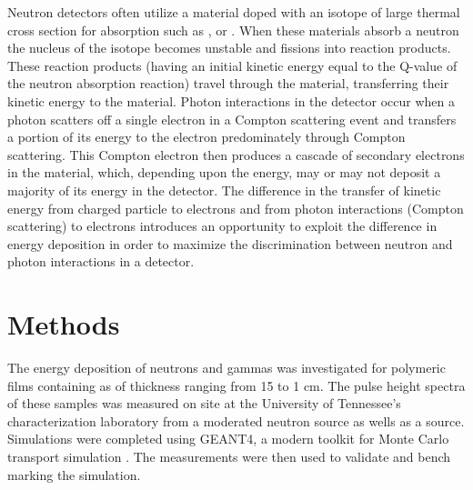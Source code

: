 \documentclass[draftcls,onecolumn]{IEEEtran}
\begin{document}
Neutron detectors often utilize a material doped with an isotope of large thermal cross section for absorption such as ,  or . 
When these materials absorb a neutron the nucleus of the isotope becomes unstable and fissions into reaction products.
These reaction products (having an initial kinetic energy equal to the Q-value of the neutron absorption reaction) travel through the material, transferring their kinetic energy to the material.
Photon interactions in the detector occur when a photon scatters off a single electron in a Compton scattering event and transfers a portion of its energy to the electron predominately through Compton scattering.
This Compton electron then produces a cascade of secondary electrons in the material, which, depending upon the energy, may or may not deposit a majority of its energy in the detector.
The difference in the transfer of kinetic energy from charged particle to electrons and from photon interactions (Compton scattering) to electrons introduces an opportunity to exploit the difference in energy deposition in order to maximize the discrimination between neutron and photon interactions in a detector.

\section{Methods}
\label{sec:Methods}
The energy deposition of neutrons and gammas was investigated for polymeric films containing  as  of thickness ranging from 15 \micron to 1 cm.
The pulse height spectra of these samples was measured on site at the University of Tennessee's characterization laboratory from a moderated neutron source as wells as a  source.
Simulations were completed using GEANT4, a modern toolkit for Monte Carlo transport simulation \cite{agostinelli_geant4simulation_2003,allison_geant4_2006}.
The measurements were then used to validate and bench marking the simulation.
\end{document}
